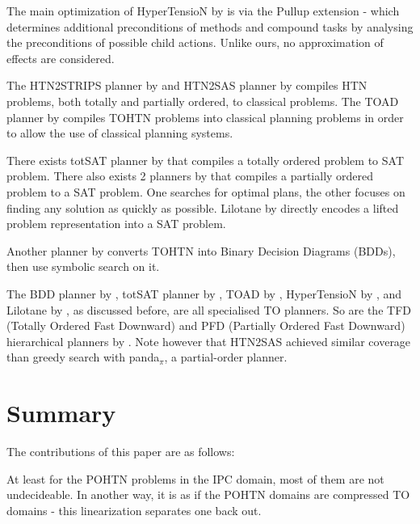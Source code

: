 \documentclass[letterpaper]{article} %
\begin{document}
The main optimization of HyperTensioN by \cite{hypertension} is via the Pullup extension - which determines additional preconditions of methods and compound tasks by analysing the preconditions of possible child actions. Unlike ours, no approximation of effects are considered.  

The HTN2STRIPS planner by \cite{HTN2STRIPS} and HTN2SAS planner by \cite{HTN2SAS} compiles HTN problems, both totally and partially ordered, to classical problems. The TOAD planner by \cite{HollerTOAD} compiles TOHTN problems into classical planning problems in order to allow the use of classical planning systems. %

There exists totSAT planner by \cite{TOtoSAT} that compiles a totally ordered problem to SAT problem. There also exists 2 planners by \cite{POtoSAT, OptimalPOtoSAT} that compiles a partially ordered problem to a SAT problem. One searches for optimal plans, the other focuses on finding any solution as quickly as possible. Lilotane by \cite{Lilotane} directly encodes a lifted problem representation into a SAT problem.

Another planner by \cite{Behnke_Speck_2021} converts TOHTN into Binary Decision Diagrams (BDDs), then use symbolic search on it.

The BDD planner by \cite{Behnke_Speck_2021}, totSAT planner by \cite{TOtoSAT}, TOAD by \cite{HollerTOAD}, HyperTensioN by \cite{hypertension}, and Lilotane by \cite{Lilotane}, as discussed before, are all specialised TO planners. So are the TFD (Totally Ordered Fast Downward) and PFD (Partially Ordered Fast Downward) hierarchical planners by \cite{PDDL4J}.  Note however that HTN2SAS achieved similar coverage than greedy search with panda$_\pi$, a partial-order planner.


\section{Summary}

The contributions of this paper are as follows:

At least for the POHTN problems in the IPC domain, most of them are not undecideable.
In another way, it is as if the POHTN domains are compressed TO domains - this linearization
separates one back out.
\end{document}
